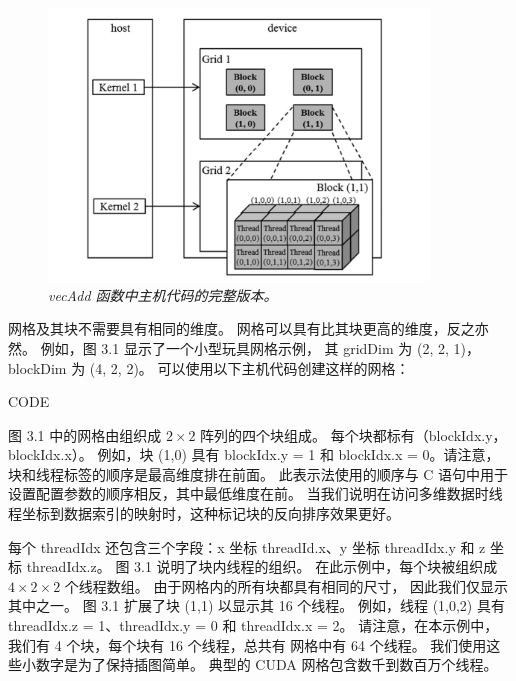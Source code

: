 \begin{figure}[H]
	\centering
	\includegraphics[width=0.9\textwidth]{figs/F3.1.png}
	\caption{\textit{\color{red} vecAdd 函数中主机代码的完整版本。}}
\end{figure}

网格及其块不需要具有相同的维度。 网格可以具有比其块更高的维度，反之亦然。 例如，图 3.1 显示了一个小型玩具网格示例，
其 gridDim 为 (2, 2, 1)，blockDim 为 (4, 2, 2)。 可以使用以下主机代码创建这样的网格：

{\color{red} CODE}

图 3.1 中的网格由组织成 $2 \times 2$ 阵列的四个块组成。 每个块都标有（blockIdx.y，blockIdx.x）。 
例如，块 (1,0) 具有 blockIdx.y = 1 和 blockIdx.x = 0。请注意，块和线程标签的顺序是最高维度排在前面。 
此表示法使用的顺序与 C 语句中用于设置配置参数的顺序相反，其中最低维度在前。 
当我们说明在访问多维数据时线程坐标到数据索引的映射时，这种标记块的反向排序效果更好。

每个 threadIdx 还包含三个字段：x 坐标 threadId.x、y 坐标 threadIdx.y 和 z 坐标 threadIdx.z。 
图 3.1 说明了块内线程的组织。 在此示例中，每个块被组织成 $4 \times 2 \times 2$ 个线程数组。 
由于网格内的所有块都具有相同的尺寸，
因此我们仅显示其中之一。 图 3.1 扩展了块 (1,1) 以显示其 16 个线程。 
例如，线程 (1,0,2) 具有 threadIdx.z = 1、threadIdx.y = 0 和 threadIdx.x = 2。
请注意，在本示例中，我们有 4 个块，每个块有 16 个线程，总共有 网格中有 64 个线程。 
我们使用这些小数字是为了保持插图简单。 典型的 CUDA 网格包含数千到数百万个线程。


